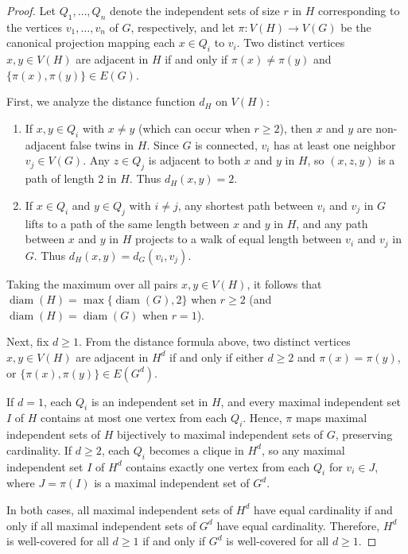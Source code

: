 \documentclass[10pt,a4paper]{amsart}
\numberwithin{equation}{section}
\theoremstyle{definition}
\begin{document}
\begin{proof}
Let $Q_1, \ldots, Q_n$ denote the independent sets of size $r$ in $H$ corresponding to the vertices $v_1, \ldots, v_n$ of $G$, respectively, and let $\pi: V(H) \to V(G)$ be the canonical projection mapping each $x \in Q_i$ to $v_i$. Two distinct vertices $x, y \in V(H)$ are adjacent in $H$ if and only if $\pi(x) \neq \pi(y)$ and $\{\pi(x),\pi(y)\} \in E(G)$.

First, we analyze the distance function $d_H$ on $V(H)$:
\begin{enumerate}
    \item If $x, y \in Q_i$ with $x \neq y$ (which can occur when $r \ge 2$), then $x$ and $y$ are non-adjacent false twins in $H$. Since $G$ is connected, $v_i$ has at least one neighbor $v_j \in V(G)$. Any $z \in Q_j$ is adjacent to both $x$ and $y$ in $H$, so $(x, z, y)$ is a path of length $2$ in $H$. Thus $d_H(x, y) = 2$.
    \item If $x \in Q_i$ and $y \in Q_j$ with $i \neq j$, any shortest path between $v_i$ and $v_j$ in $G$ lifts to a path of the same length between $x$ and $y$ in $H$, and any path between $x$ and $y$ in $H$ projects to a walk of equal length between $v_i$ and $v_j$ in $G$. Thus $d_H(x, y) = d_G(v_i, v_j)$.
\end{enumerate}

Taking the maximum over all pairs $x, y \in V(H)$, it follows that $\operatorname{diam}(H) = \max\{\operatorname{diam}(G), 2\}$ when $r \ge 2$ (and $\operatorname{diam}(H) = \operatorname{diam}(G)$ when $r = 1$).

Next, fix $d \ge 1$. From the distance formula above, two distinct vertices $x, y \in V(H)$ are adjacent in $H^d$ if and only if either $d \ge 2$ and $\pi(x) = \pi(y)$, or $\{\pi(x), \pi(y)\} \in E(G^d)$. 

If $d = 1$, each $Q_i$ is an independent set in $H$, and every maximal independent set $I$ of $H$ contains at most one vertex from each $Q_i$. Hence, $\pi$ maps maximal independent sets of $H$ bijectively to maximal independent sets of $G$, preserving cardinality. If $d \ge 2$, each $Q_i$ becomes a clique in $H^d$, so any maximal independent set $I$ of $H^d$ contains exactly one vertex from each $Q_i$ for $v_i \in J$, where $J = \pi(I)$ is a maximal independent set of $G^d$.

In both cases, all maximal independent sets of $H^d$ have equal cardinality if and only if all maximal independent sets of $G^d$ have equal cardinality. Therefore, $H^d$ is well-covered for all $d \ge 1$ if and only if $G^d$ is well-covered for all $d \ge 1$.
\end{proof}
\end{document}
